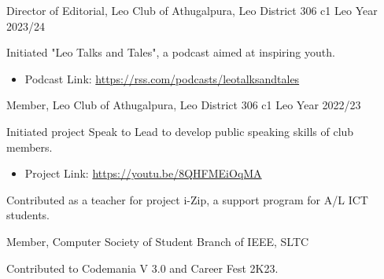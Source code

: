 

\begin{cventries}

  \cventry
    {Director of Editorial, Leo Club of Athugalpura, Leo District 306 c1} %
    {} %
    {} %
    {Leo Year 2023/24} %
    {
      \begin{cvitems} %
        \item {Initiated "Leo Talks and Tales", a podcast aimed at inspiring youth.}
        \begin{itemize}
            \item {Podcast Link: \url{https://rss.com/podcasts/leotalksandtales}}
        \end{itemize}
      \end{cvitems}
    }

  \cventry
    {Member, Leo Club of Athugalpura, Leo District 306 c1} %
    {} %
    {} %
    {Leo Year 2022/23} %
    {
      \begin{cvitems} %
        \item {Initiated project Speak to Lead to develop public speaking skills of club members.}
        \begin{itemize}
            \item {Project Link: \url{https://youtu.be/8QHFMEiOqMA}}
        \end{itemize}
        \item {Contributed as a teacher for project i-Zip, a support program for A/L ICT students.}
      \end{cvitems}
    }

  \cventry
    {Member, Computer Society of Student Branch of IEEE, SLTC} %
    {} %
    {} %
    {} %
    {
      \begin{cvitems} %
        \item {Contributed to Codemania V 3.0 and Career Fest 2K23.}
      \end{cvitems}
    }


\end{cventries}
